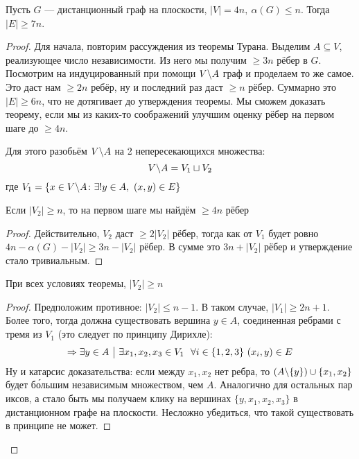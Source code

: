 \begin{theorem}
	Пусть $G$ --- дистанционный граф на плоскости, $|V| = 4n,\ \alpha(G) \le n$. Тогда $|E| \ge 7n$.
\end{theorem}

\begin{proof}
	Для начала, повторим рассуждения из теоремы Турана. Выделим $A \subseteq V$, реализующее число независимости. Из него мы получим $\ge 3n$ рёбер в $G$. Посмотрим на индуцированный при помощи $V \backslash A$ граф и проделаем то же самое. Это даст нам $\ge 2n$ ребёр, ну и последний раз даст $\ge n$ рёбер. Суммарно это $|E| \ge 6n$, что не дотягивает до утверждения теоремы. Мы сможем доказать теорему, если мы из каких-то соображений улучшим оценку рёбер на первом шаге до $\ge 4n$.
	
	Для этого разобьём $V \backslash A$ на 2 непересекающихся множества:
	\[
		V \backslash A = V_1 \sqcup V_2
	\]
	где $V_1 = \{x \in V \backslash A \colon \exists! y \in A,\ (x, y) \in E\}$
	\begin{proposition}
		Если $|V_2| \ge n$, то на первом шаге мы найдём $\ge 4n$ рёбер
	\end{proposition}

	\begin{proof}
		Действительно, $V_2$ даст $\ge 2|V_2|$ рёбер, тогда как от $V_1$ будет ровно $4n - \alpha(G) - |V_2| \ge 3n - |V_2|$ рёбер. В сумме это $3n + |V_2|$ рёбер и утверждение стало тривиальным.
	\end{proof}

	\begin{lemma}
		При всех условиях теоремы, $|V_2| \ge n$
	\end{lemma}

	\begin{proof}
		Предположим противное: $|V_2| \le n - 1$. В таком случае, $|V_1| \ge 2n + 1$. Более того, тогда должна существовать вершина $y \in A$, соединенная ребрами с тремя из $V_1$ (это следует по принципу Дирихле):
		\[
			\Rightarrow \exists y \in A \ \big|\  \exists x_1, x_2, x_3 \in V_1\ \ \forall i \in \{1, 2, 3\}\ (x_i, y) \in E
		\]
		Ну и катарсис доказательства: если между $x_1, x_2$ нет ребра, то $(A \backslash \{y\}) \cup \{x_1, x_2\}$ будет б\'{о}льшим независимым множеством, чем $A$. Аналогично для остальных пар иксов, а стало быть мы получаем клику на вершинах $\{y, x_1, x_2, x_3\}$ в дистанционном графе на плоскости. Несложно убедиться, что такой существовать в принципе не может.
	\end{proof}
\end{proof}

